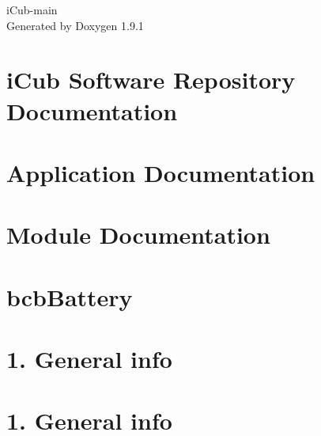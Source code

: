 \let\mypdfximage\pdfximage\def\pdfximage{\immediate\mypdfximage}\documentclass[twoside]{book}
\newcommand{\+}{\discretionary{\mbox{\scriptsize$\hookleftarrow$}}{}{}}
\newcommand{\clearemptydoublepage}{%
  \newpage{\pagestyle{empty}\cleardoublepage}%
}
\begin{document}
\raggedbottom

\hypersetup{pageanchor=false,
             bookmarksnumbered=true,
             pdfencoding=unicode
            }
\begin{titlepage}
\vspace*{7cm}
\begin{center}%
{\Large i\+Cub-\/main }\\
\vspace*{1cm}
{\large Generated by Doxygen 1.9.1}\\
\end{center}
\end{titlepage}
\clearemptydoublepage
{}
\tableofcontents
\clearemptydoublepage
{}
\hypersetup{pageanchor=true}

\chapter{i\+Cub Software Repository Documentation}
\label{index}\hypertarget{index}{}
\chapter{Application Documentation}
\label{application_documentation}

\chapter{Module Documentation}
\label{module_documentation}

\chapter{bcb\+Battery}
\label{md_icub_main_src_libraries_icubmod_bcbBattery_README}

\chapter{1. General info}
\label{md_icub_main_src_libraries_icubmod_embObjBattery_README}

\chapter{1. General info}
\label{md_icub_main_src_libraries_icubmod_embObjMultipleFTsensors_README}

\end{document}
